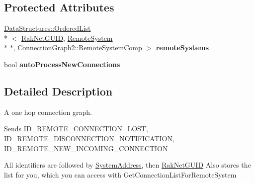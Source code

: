 \subsection*{Protected Attributes}
\begin{DoxyCompactItemize}
\item 
\hypertarget{class_rak_net_1_1_connection_graph2_a28b85c315499a99e9792642a5e4abb64}{\hyperlink{class_data_structures_1_1_ordered_list}{Data\-Structures\-::\-Ordered\-List}\\*
$<$ \hyperlink{struct_rak_net_1_1_rak_net_g_u_i_d}{Rak\-Net\-G\-U\-I\-D}, \hyperlink{struct_rak_net_1_1_connection_graph2_1_1_remote_system}{Remote\-System} \\*
$\ast$, Connection\-Graph2\-::\-Remote\-System\-Comp $>$ {\bfseries remote\-Systems}}\label{class_rak_net_1_1_connection_graph2_a28b85c315499a99e9792642a5e4abb64}

\item 
\hypertarget{class_rak_net_1_1_connection_graph2_af858d228371ca8aafb44cf9d6ee74923}{bool {\bfseries auto\-Process\-New\-Connections}}\label{class_rak_net_1_1_connection_graph2_af858d228371ca8aafb44cf9d6ee74923}

\end{DoxyCompactItemize}


\subsection{Detailed Description}
A one hop connection graph. 

Sends I\-D\-\_\-\-R\-E\-M\-O\-T\-E\-\_\-\-C\-O\-N\-N\-E\-C\-T\-I\-O\-N\-\_\-\-L\-O\-S\-T, I\-D\-\_\-\-R\-E\-M\-O\-T\-E\-\_\-\-D\-I\-S\-C\-O\-N\-N\-E\-C\-T\-I\-O\-N\-\_\-\-N\-O\-T\-I\-F\-I\-C\-A\-T\-I\-O\-N, I\-D\-\_\-\-R\-E\-M\-O\-T\-E\-\_\-\-N\-E\-W\-\_\-\-I\-N\-C\-O\-M\-I\-N\-G\-\_\-\-C\-O\-N\-N\-E\-C\-T\-I\-O\-N\par
 All identifiers are followed by \hyperlink{struct_rak_net_1_1_system_address}{System\-Address}, then \hyperlink{struct_rak_net_1_1_rak_net_g_u_i_d}{Rak\-Net\-G\-U\-I\-D} Also stores the list for you, which you can access with Get\-Connection\-List\-For\-Remote\-System 

